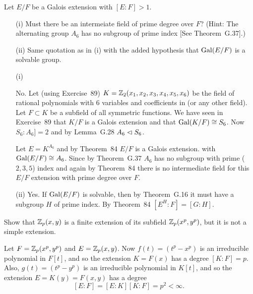 \begin{myenumerate}

\item
\begin{excopy}
Let \(E/F\) be a Galois extension with \([E:F]>1\).
\begin{itemize}
 \item[(i)]
   Must there be an intermeiate field of prime degree over $F$?
   (Hint: The alternating group \(A_6\) has no subgroup of prime index
    [See Theorem~G.37].)
 \item[(ii)]
   Same quotation as in (i) with the added hypothesis that \(\mathop{\rm Gal}\nolimits(E/F)\)
   is a solvable group.
\end{itemize}
\end{excopy}

\begin{itemize}
 \item[(i)]

   No. Let (using Exercise~89) \(K = \mathbb{Z}_2(x_1,x_2,x_3,x_4,x_5,x_6)\)
   be the field of rational polynomials with $6$ variables and
   coefficients in  (or any other field). Let \(F \subset K\) be
   a subfield of all symmetric functions.  We have seen in Exercise~89
   that \(K/F\) is a Galois extension and that \(\mathop{\rm Gal}\nolimits(K/F) \cong
   S_6\).  Now \(S_6:A_6] = 2\) and by Lemma~G.28 \cite{Rotman98}
   \(A_6 \vartriangleleft S_6\).

   Let \(E=K^{A_6}\) and
   by Theorem~84 \cite{Rotman98} \(E/F\) is a Galois extension.
   with \(\mathop{\rm Gal}\nolimits(E/F) \cong A_6\). Since by Theorem~G.37 \cite{Rotman98}
   \(A_6\) has no subgroup with prime (\(2,3,5\)) index
   and again by Theorem~84 \cite{Rotman98} there is no intermediate
   field for this \(E/F\) extension with prime degree over $F$.

 \item[(ii)]
   Yes. If \(\mathop{\rm Gal}\nolimits(E/F)\) is solvable, then by Theorem~G.16 \cite{Rotman98}
   it must have a subgroup $H$ of prime index. By Theorem~84 \cite{Rotman98}
   \([E^H:F] = [G:H]\).
\end{itemize}

\item
\begin{excopy}
Show that \(\mathbb{Z}_p(x,y)\) is a finite extension
of its subfield \(\mathbb{Z}_p(x^p,y^p)\),
but it is not a simple extension.
\end{excopy}

Let \(F=\mathbb{Z}_p(x^p,y^p)\) and \(E=\mathbb{Z}_p(x,y)\).
Now \(f(t) = (t^p - x^p)\) is an irreducible polynomial in \(F[t]\),
and so the extension \(K=F(x)\) has a degree \([K:F]=p\).
Also, \(g(t) = (t^p - y^p)\) is an irreducible polynomial in \(K[t]\),
and so the extension \(E=K(y)=F(x,y)\) has a degree
\begin{equation} \label{eq:EF:p2}
[E:F] = [E:K][K:F] = p^2 < \infty.
\end{equation}


\end{myenumerate}
